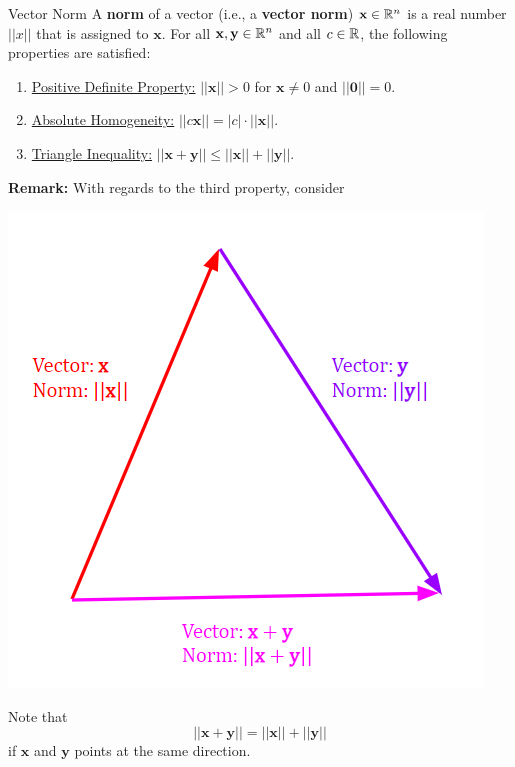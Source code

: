 \documentclass[letterpaper]{article}
\newcommand{\0}{\mathbf{0}}
\newcommand{\y}{\mathbf{y}}
\newcommand{\x}{\mathbf{x}}
\begin{document}
\begin{definition}{Vector Norm}{}
    A \textbf{norm} of a vector (i.e., a \textbf{vector norm}) $\x \in \R^n$ is a real number $||x||$ that is assigned to $\x$. For all $\x, \y \in \R^n$ and all $c \in \mathbb{R}$, the following properties are satisfied: 
    \begin{enumerate}
        \item \underline{Positive Definite Property:} $||\x|| > 0$ for $\x \neq 0$ and $||\0|| = 0$. 
        \item \underline{Absolute Homogeneity:} $||c\x|| = |c| \cdot ||\x||$. 
        \item \underline{Triangle Inequality:} $||\x + \y|| \leq ||\x|| + ||\y||$. 
    \end{enumerate}
\end{definition}
\textbf{Remark:} With regards to the third property, consider \begin{center}
    \includegraphics[scale=0.6]{../assets/tri_inequality.png}
\end{center}
Note that \[||\x + \y|| = ||\x|| + ||\y||\] if $\x$ and $\y$ points at the same direction.
\end{document}
